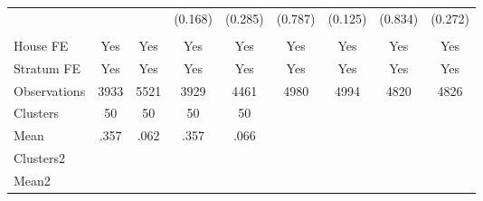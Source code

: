 {\begin{tabular}{l*{8}{c}}
                &         &         &  (0.168)&  (0.285)&  (0.787)&  (0.125)&  (0.834)&  (0.272)\\
                &         &         &         &         &         &         &         &         \\
House FE        &      Yes&      Yes&      Yes&      Yes&      Yes&      Yes&      Yes&      Yes\\
Stratum FE      &      Yes&      Yes&      Yes&      Yes&      Yes&      Yes&      Yes&      Yes\\
\midrule
Observations    &     3933&     5521&     3929&     4461&     4980&     4994&     4820&     4826\\
Clusters        &       50&       50&       50&       50&         &         &         &         \\
Mean            &     .357&     .062&     .357&     .066&         &         &         &         \\
Clusters2       &         &         &         &         &         &         &         &         \\
Mean2           &         &         &         &         &         &         &         &         \\
\bottomrule
\end{tabular}
}
